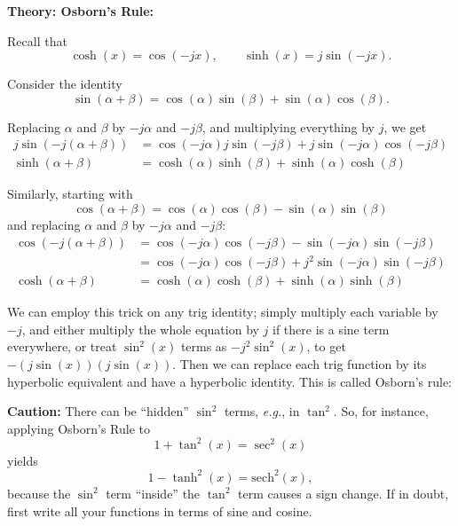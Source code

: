 \documentclass{article}
\newcommand{\sech}{\mathrm{sech}}
\begin{document}
\textbf{Theory: Osborn's Rule:}

\vspace{5mm}


Recall that
\[\cosh(x)=\cos(-jx),\qquad \sinh(x)=j\sin(-jx).\]

\bigskip


Consider the identity
\[\sin(\alpha+\beta)=\cos(\alpha)\sin(\beta)+\sin(\alpha)\cos(\beta).\]

Replacing $\alpha$ and $\beta$ by $-j\alpha$ and $-j\beta$, and multiplying everything by $j$, we get
\begin{align*}
	j\sin(-j(\alpha+\beta))&=\cos(-j\alpha)j\sin(-j\beta)+j\sin(-j\alpha)\cos(-j\beta)\\
	\sinh(\alpha+\beta)&=\cosh(\alpha)\sinh(\beta)+\sinh(\alpha)\cosh(\beta)
\end{align*}

\bigskip

Similarly, starting with
\[\cos(\alpha+\beta)=\cos(\alpha)\cos(\beta)-\sin(\alpha)\sin(\beta)\]
and replacing $\alpha$ and $\beta$ by $-j\alpha$ and $-j\beta$:
\begin{align*}
	\cos(-j(\alpha+\beta))&=\cos(-j\alpha)\cos(-j\beta)-\sin(-j\alpha)\sin(-j\beta)\\
	&=\cos(-j\alpha)\cos(-j\beta)+j^2\sin(-j\alpha)\sin(-j\beta)\\
	\cosh(\alpha+\beta)&=\cosh(\alpha)\cosh(\beta)+\sinh(\alpha)\sinh(\beta)
\end{align*}

\bigskip


We can employ this trick on any trig identity; simply multiply each variable by $-j$, and either multiply the whole equation by $j$ if there is a sine term everywhere, or treat $\sin^2(x)$ terms as $-j^2\sin^2(x)$, to get $-(j\sin(x))(j\sin(x))$. Then we can replace each trig function by its hyperbolic equivalent and have a hyperbolic identity. This is called Osborn's rule:


\noindent{}\bigskip



\textbf{Caution:} There can be ``hidden'' $\sin^2$ terms, \textit{e.g.}, in $\tan^2$. So, for instance, applying Osborn's Rule to
\[1+\tan^2(x)=\sec^2(x)\]
yields
\[1-\tanh^2(x)=\sech^2(x),\]
because the $\sin^2$ term ``inside'' the $\tan^2$ term causes a sign change. If in doubt, first write all your functions in terms of sine and cosine.
\end{document}
